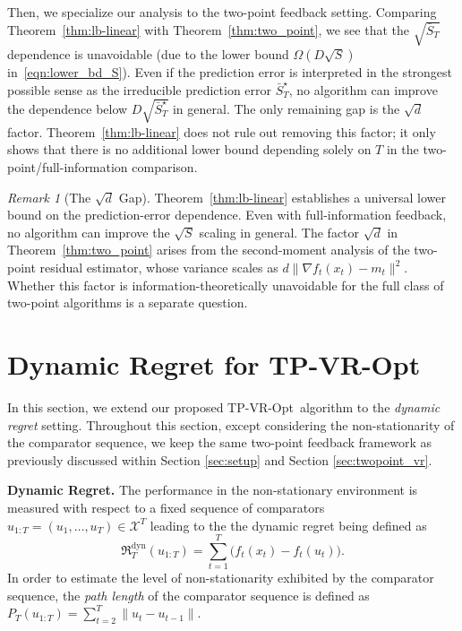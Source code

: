 \documentclass[journal,onecolumn]{IEEEtran}
\newcommand{\cX}{\mathcal{X}}
\theoremstyle{plain}
\theoremstyle{definition}
\theoremstyle{remark}
\newtheorem{remark}[theorem]{Remark}
\newcommand{\regret}{\mathfrak{R}}
\newcommand{\tpvr}{{\sc TP-VR-Opt}}
\begin{document}
Then, we specialize our analysis to the two-point feedback setting. Comparing Theorem~\ref{thm:lb-linear} with Theorem~\ref{thm:two_point}, we see
that the $\sqrt{\bar S_T}$ dependence is unavoidable (due to the lower bound $\Omega(D\sqrt{S})$ in~\eqref{eqn:lower_bd_S}). Even if the
prediction error is interpreted in the strongest possible sense as the
irreducible prediction error $\bar S_T^\star$, no algorithm can improve the
dependence below $D\sqrt{\bar S_T^\star}$ in general. The only remaining gap is
the $\sqrt d$ factor. Theorem~\ref{thm:lb-linear} does not rule out removing this
factor; it only shows that there is no additional lower bound depending solely
on $T$ in the two-point/full-information comparison.

\begin{remark}[The $\sqrt{d}$ Gap]
Theorem~\ref{thm:lb-linear} establishes a universal lower bound on the
prediction-error dependence. Even with full-information feedback, no algorithm
can improve the $\sqrt S$ scaling in general. The factor $\sqrt d$
in Theorem~\ref{thm:two_point} arises from the second-moment analysis of the
two-point residual estimator, whose variance scales as
$d\|\nabla f_t(x_t)-m_t\|^2$. Whether this factor is information-theoretically
unavoidable for the full class of two-point algorithms is a separate question.
\end{remark}
\section{Dynamic Regret for \tpvr}
\label{sec:implications}

In this section, we extend our proposed \tpvr\, algorithm to the \emph{dynamic
regret} setting. Throughout this section, except considering the non-stationarity
of the comparator sequence, we keep the same two-point feedback framework as previously
discussed within Section \ref{sec:setup} and Section \ref{sec:twopoint_vr}.

\textbf{Dynamic Regret.}
The performance in the non-stationary environment is measured with respect to a fixed sequence of comparators $u_{1:T}=
(u_{1},\ldots,u_{T}) \in  \cX^T$ leading to the  the dynamic regret being defined as 
\begin{equation*}
\regret^{\mathrm{dyn}}_{T}(u_{1:T})=\sum_{t=1}^{T}\bigl(f_{t}(x_{t})-f_{t}(u_{t})\bigr).
\end{equation*}
In order to estimate the level of non-stationarity exhibited by the comparator
sequence, the {\em path length} of the comparator sequence is defined as $P_{T}(u_{1:T}) = \sum_{t=2}^{T}\|u_{t}-u_{t-1}\|.$
\end{document}
